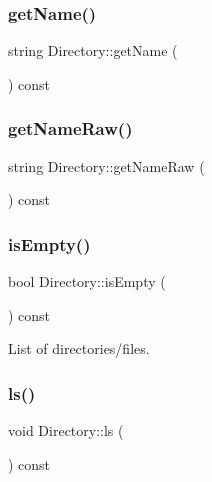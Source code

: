 \mbox{\label{class_directory_adfb3c1b9b65ca47aaef4c91fb44adf83}} 
\subsubsection{\texorpdfstring{get\+Name()}{getName()}}
{\footnotesize\ttfamily string Directory\+::get\+Name (\begin{DoxyParamCaption}{ }\end{DoxyParamCaption}) const\hspace{0.3cm}{\ttfamily [inline]}}

\mbox{\label{class_directory_ac9641eabb49e810239d66bcc99bb8e98}} 
\subsubsection{\texorpdfstring{get\+Name\+Raw()}{getNameRaw()}}
{\footnotesize\ttfamily string Directory\+::get\+Name\+Raw (\begin{DoxyParamCaption}{ }\end{DoxyParamCaption}) const\hspace{0.3cm}{\ttfamily [inline]}}

\mbox{\label{class_directory_a5d3efa22fedc9f37963b2217e60beb3c}} 
\subsubsection{\texorpdfstring{is\+Empty()}{isEmpty()}}
{\footnotesize\ttfamily bool Directory\+::is\+Empty (\begin{DoxyParamCaption}{ }\end{DoxyParamCaption}) const}



List of directories/files. 

\mbox{\label{class_directory_a97bf31f9a554ff687a410f735d8770dd}} 
\subsubsection{\texorpdfstring{ls()}{ls()}}
{\footnotesize\ttfamily void Directory\+::ls (\begin{DoxyParamCaption}{ }\end{DoxyParamCaption}) const}



